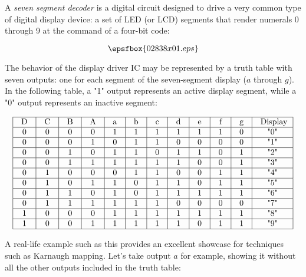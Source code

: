 

A {\it seven segment decoder} is a digital circuit designed to drive a very common type of digital display device: a set of LED (or LCD) segments that render numerals 0 through 9 at the command of a four-bit code:

$$\epsfbox{02838x01.eps}$$

The behavior of the display driver IC may be represented by a truth table with seven outputs: one for each segment of the seven-segment display ($a$ through $g$).  In the following table, a "1" output represents an active display segment, while a "0" output represents an inactive segment:


$$\vbox{\offinterlineskip
\halign{\strut
\vrule \quad\hfil # \ \hfil & 
\vrule \quad\hfil # \ \hfil & 
\vrule \quad\hfil # \ \hfil & 
\vrule \quad\hfil # \ \hfil & 
\vrule \quad\hfil # \ \hfil & 
\vrule \quad\hfil # \ \hfil & 
\vrule \quad\hfil # \ \hfil & 
\vrule \quad\hfil # \ \hfil & 
\vrule \quad\hfil # \ \hfil & 
\vrule \quad\hfil # \ \hfil & 
\vrule \quad\hfil # \ \hfil & 
\vrule \quad\hfil # \ \hfil \vrule \cr
\noalign{\hrule}
%
D & C & B & A & a & b & c & d & e & f & g & Display\cr
%
\noalign{\hrule}
%
0 & 0 & 0 & 0 & 1 & 1 & 1 & 1 & 1 & 1 & 0 & "0" \cr
%
\noalign{\hrule}
%
0 & 0 & 0 & 1 & 0 & 1 & 1 & 0 & 0 & 0 & 0 & "1" \cr
%
\noalign{\hrule}
%
0 & 0 & 1 & 0 & 1 & 1 & 0 & 1 & 1 & 0 & 1 & "2" \cr
%
\noalign{\hrule}
%
0 & 0 & 1 & 1 & 1 & 1 & 1 & 1 & 0 & 0 & 1 & "3" \cr
%
\noalign{\hrule}
%
0 & 1 & 0 & 0 & 0 & 1 & 1 & 0 & 0 & 1 & 1 & "4" \cr
%
\noalign{\hrule}
%
0 & 1 & 0 & 1 & 1 & 0 & 1 & 1 & 0 & 1 & 1 & "5" \cr
%
\noalign{\hrule}
%
0 & 1 & 1 & 0 & 1 & 0 & 1 & 1 & 1 & 1 & 1 & "6" \cr
%
\noalign{\hrule}
%
0 & 1 & 1 & 1 & 1 & 1 & 1 & 0 & 0 & 0 & 0 & "7" \cr
%
\noalign{\hrule}
%
1 & 0 & 0 & 0 & 1 & 1 & 1 & 1 & 1 & 1 & 1 & "8" \cr
%
\noalign{\hrule}
%
1 & 0 & 0 & 1 & 1 & 1 & 1 & 1 & 0 & 1 & 1 & "9" \cr
%
\noalign{\hrule}
} %
}$$ %

A real-life example such as this provides an excellent showcase for techniques such as Karnaugh mapping.  Let's take output $a$ for example, showing it without all the other outputs included in the truth table:

